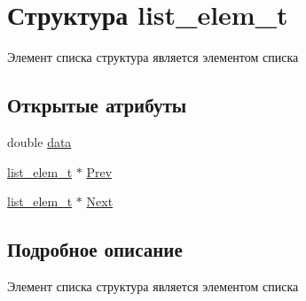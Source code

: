 \hypertarget{structlist__elem__t}{
\section{Структура list\_\-elem\_\-t}
\label{structlist__elem__t}
}


Элемент списка структура является элементом списка  


\subsection*{Открытые атрибуты}
\begin{DoxyCompactItemize}
\item 
double \hyperlink{structlist__elem__t_acabfb252c5c40db408dba264843b0476}{data}
\item 
\hyperlink{structlist__elem__t}{list\_\-elem\_\-t} $\ast$ \hyperlink{structlist__elem__t_a01bae5033f32518295718a285da17524}{Prev}
\item 
\hyperlink{structlist__elem__t}{list\_\-elem\_\-t} $\ast$ \hyperlink{structlist__elem__t_aed10cd9b5fdb30bb6c2c04052c36145d}{Next}
\end{DoxyCompactItemize}


\subsection{Подробное описание}
Элемент списка структура является элементом списка 

